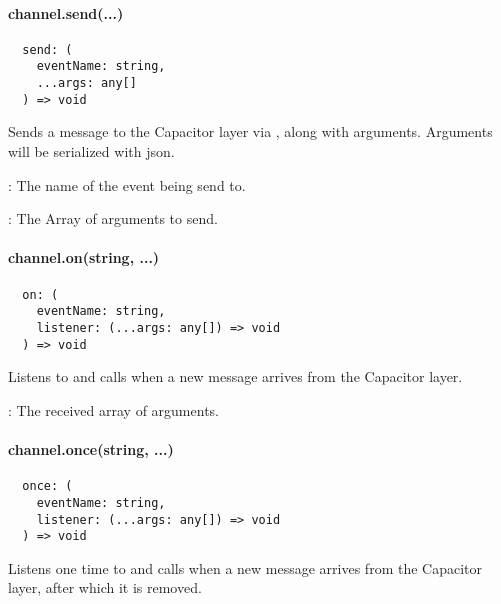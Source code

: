 
\paragraph{channel.send(...)}

\begin{verbatim}
  send: (
    eventName: string,
    ...args: any[]
  ) => void
\end{verbatim}

Sends a message to the Capacitor layer via , along with arguments.
Arguments will be serialized with \ac{json}.

\begin{arguments}
  \item {}: The name of the event being send to.
  \item {}: The Array of arguments to send.
\end{arguments}


\newpage

\paragraph{channel.on(string, ...)}

\begin{verbatim}
  on: (
    eventName: string,
    listener: (...args: any[]) => void
  ) => void
\end{verbatim}

Listens to  and calls  when a new message arrives from the Capacitor layer.

\begin{arguments}
  \item {}: The received array of arguments.
\end{arguments}


\paragraph{channel.once(string, ...)}

\begin{verbatim}
  once: (
    eventName: string,
    listener: (...args: any[]) => void
  ) => void
\end{verbatim}

Listens one time to  and calls  when a new message arrives from the Capacitor layer, after which it is removed.

